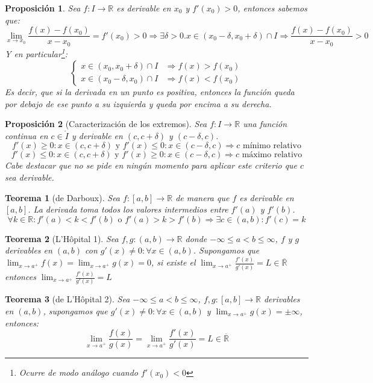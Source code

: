\documentclass[10pt,a4paper,openright]{book}
\newtheorem{teorema}{Teorema}[chapter]
\newtheorem{proposicion}{Proposición}[chapter]
\begin{document}
\begin{proposicion}
Sea $f:I\rightarrow\mathbb R$ es derivable en $x_0$ y $f'(x_0)>0$, entonces sabemos que:
$$\lim_{x\rightarrow x_0}\frac{f(x)-f(x_0)}{x-x_0}=f'(x_0)>0\Rightarrow \exists \delta>0. x\in (x_0-\delta, x_0+\delta)\cap I\Rightarrow \frac{f(x)-f(x_0)}{x-x_0}>0$$
Y en particular\footnote{Ocurre de modo análogo cuando $f'(x_0)<0$}:
$$\begin{cases} x\in (x_0,x_0+\delta)\cap I &\Rightarrow f(x)>f(x_0)\\
x\in (x_0-\delta,x_0)\cap I & \Rightarrow f(x)<f(x_0)\end{cases}$$
Es decir, que si la derivada en un punto es positiva, entonces la función queda por debajo de ese punto a su izquierda y queda por encima a su derecha.
\end{proposicion}

\begin{proposicion}[Caracterización de los extremos]
Sea $f:I\rightarrow \mathbb R$ una función continua en $c\in \mathring{I}$ y derivable en $(c,c+\delta)$ y $(c-\delta, c)$.
$$f'(x)\geq 0: x\in (c, c+\delta)\mbox{ y }f'(x)\leq 0: x\in (c-\delta, c)\Rightarrow c\mbox{ mínimo relativo}$$
$$f'(x)\leq 0: x\in (c, c+\delta)\mbox{ y }f'(x)\geq 0: x\in (c-\delta,c)\Rightarrow c\mbox{ máximo relativo}$$
Cabe destacar que no se pide en ningún momento para aplicar este criterio que $c$ sea derivable. 
\end{proposicion}

\begin{teorema}[de Darboux]
Sea $f:[a,b]\rightarrow \mathbb R$ de manera que $f$  es derivable en $[a,b]$. La derivada toma todos los valores intermedios entre $f'(a)$ y $f'(b)$.
$$\forall k\in \mathbb R: f'(a)<k<f'(b)\mbox{ o } f'(a)>k>f'(b)\Rightarrow \exists c\in (a,b): f'(c)=k$$
\end{teorema}

\begin{teorema}[L'Hôpital 1]
Sea $f,g: (a,b) \rightarrow \mathbb R$ donde $-\infty \leq a < b \leq \infty$, $f$ y $g$ derivables en $(a,b)$ con $g'(x)\neq 0: \forall x\in (a,b)$. Supongamos que $\lim_{x\rightarrow a^+} f(x)=\lim_{x\rightarrow a^+} g(x)=0$, si existe el $\lim_{x\rightarrow a^+} \frac{f'(x)}{g'(x)}=L\in \overline{\mathbb R}$ entonces $\lim_{x\rightarrow a^+}\frac{f'(x)}{g'(x)}=L$
\end{teorema}

\begin{teorema}[de L'Hôpital 2]
Sea $-\infty\leq a < b \leq \infty$, $f,g: [a,b]\rightarrow \mathbb R$ derivables en $(a,b)$, supongamos que $g'(x)\neq 0: \forall x\in (a,b)$ y $\lim_{x\rightarrow a^+}g(x)=\pm\infty$, entonces:
$$\lim_{x\rightarrow a^+}\frac{f(x)}{g(x)}=\lim_{x\rightarrow a^+}\frac{f'(x)}{g'(x)}=L\in \overline{\mathbb R}$$
\end{teorema}
\end{document}
